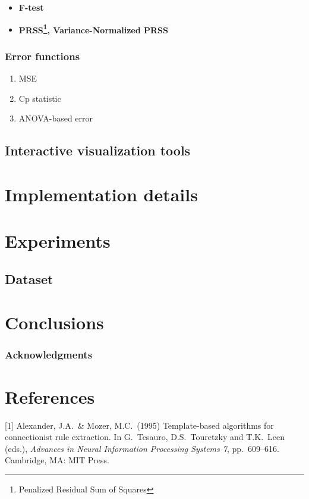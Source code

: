 \documentclass{article}
\begin{document}
\begin{itemize}
\item \textbf{F-test} 

\item \textbf{PRSS\footnote{Penalized Residual Sum of Squares}, Variance-Normalized PRSS} 

\end{itemize}

\subsubsection{Error functions}
\begin{enumerate}
\item MSE
\item Cp statistic
\item ANOVA-based error
\end{enumerate}

\subsection{Interactive visualization tools}

\section{Implementation details}

\section{Experiments}

\subsection{Dataset}

\section{Conclusions}

\subsubsection*{Acknowledgments}


\section*{References}
\small

[1] Alexander, J.A.\ \& Mozer, M.C.\ (1995) Template-based algorithms
for connectionist rule extraction. In G.\ Tesauro, D.S.\ Touretzky and
T.K.\ Leen (eds.), {\it Advances in Neural Information Processing
  Systems 7}, pp.\ 609--616. Cambridge, MA: MIT Press.
\end{document}
